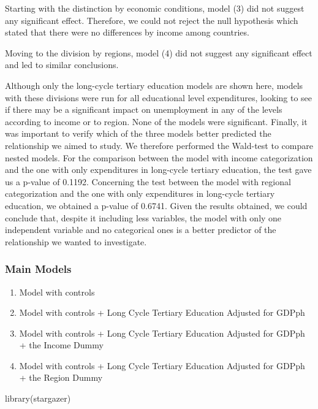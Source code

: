 \documentclass[
]{article}
\newenvironment{Shaded}{\begin{snugshade}}{\end{snugshade}}
\newcommand{\FunctionTok}[1]{\textcolor[rgb]{0.00,0.00,0.00}{#1}}
\newcommand{\NormalTok}[1]{#1}
\begin{document}
Starting with the distinction by economic conditions, model (3) did not
suggest any significant effect. Therefore, we could not reject the null
hypothesis which stated that there were no differences by income among
countries.

Moving to the division by regions, model (4) did not suggest any
significant effect and led to similar conclusions.

Although only the long-cycle tertiary education models are shown here,
models with these divisions were run for all educational level
expenditures, looking to see if there may be a significant impact on
unemployment in any of the levels according to income or to region. None
of the models were significant. Finally, it was important to verify
which of the three models better predicted the relationship we aimed to
study. We therefore performed the Wald-test to compare nested models.
For the comparison between the model with income categorization and the
one with only expenditures in long-cycle tertiary education, the test
gave us a p-value of 0.1192. Concerning the test between the model with
regional categorization and the one with only expenditures in long-cycle
tertiary education, we obtained a p-value of 0.6741. Given the results
obtained, we could conclude that, despite it including less variables,
the model with only one independent variable and no categorical ones is
a better predictor of the relationship we wanted to investigate.

\hypertarget{main-models}{%
\subsubsection{Main Models}\label{main-models}}

\begin{enumerate}
\def\labelenumi{\arabic{enumi})}
\item
  Model with controls
\item
  Model with controls + Long Cycle Tertiary Education Adjusted for GDPph
\item
  Model with controls + Long Cycle Tertiary Education Adjusted for GDPph
  + the Income Dummy
\item
  Model with controls + Long Cycle Tertiary Education Adjusted for GDPph
  + the Region Dummy
\end{enumerate}

\begin{Shaded}
\begin{Highlighting}[]
\FunctionTok{library}\NormalTok{(stargazer)}
\end{Highlighting}
\end{Shaded}
\end{document}
